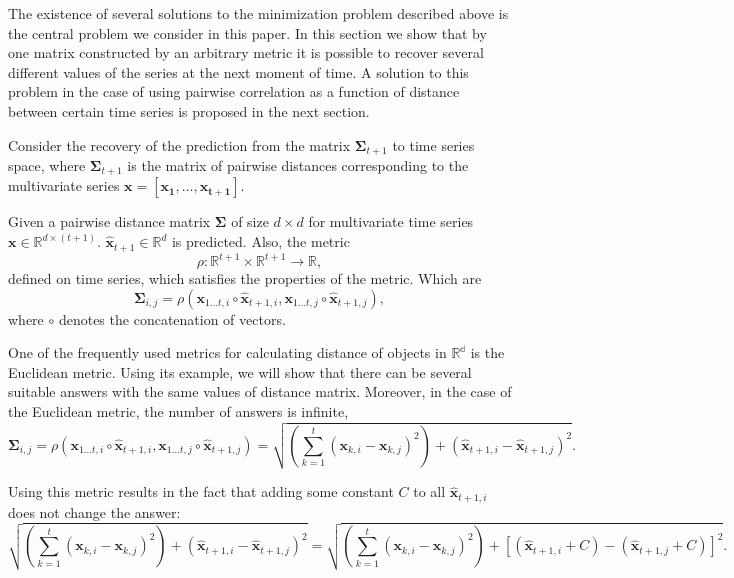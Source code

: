 \documentclass{article}
\begin{document}
The existence of several solutions to the minimization problem described above is the central problem we consider in this paper. In this section we show that by one matrix constructed by an arbitrary metric it is possible to recover several different values of the series at the next moment of time. A solution to this problem in the case of using pairwise correlation as a function of distance between certain time series is proposed in the next section.

Consider the recovery of the prediction from the matrix $\mathbf{\Sigma}_{t+1}$ to time series space, where $\mathbf{\Sigma}_{t+1}$ is the matrix of pairwise distances corresponding to the multivariate series $\mathbf{x}=[\mathbf{x_1}, \ldots, \mathbf{x_{t+1}}]$.

Given a pairwise distance matrix $\mathbf{\Sigma}$ of size $d \times d$ for multivariate time series $\mathbf{x} \in \mathbb{R}^{d \times (t+1)}$. $\hat{\mathbf{x}}_{t+1} \in \mathbb{R}^d$ is predicted. Also, the metric \[ \rho : \mathbb{R}^{t+1} \times \mathbb{R}^{t+1} \rightarrow \mathbb{R}, \] defined on time series, which satisfies the properties of the metric. Which are \[\mathbf{\Sigma}_{i,j} = \rho(\mathbf{x}_{1 \ldots t, i} \circ \hat{\mathbf{x}}_{t+1, i}, \mathbf{x}_{1 \ldots t, j} \circ \hat{\mathbf{x}}_{t+1, j}),\] where $\circ$ denotes the concatenation of vectors.

One of the frequently used metrics for calculating distance of objects in $\mathbb{R^d}$ is the Euclidean metric. Using its example, we will show that there can be several suitable answers with the same values of distance matrix. Moreover, in the case of the Euclidean metric, the number of answers is infinite,
\[\mathbf{\Sigma}_{i,j} = \rho(\mathbf{x}_{1 \ldots t, i} \circ \hat{\mathbf{x}}_{t+1, i}, \mathbf{x}_{1 \ldots t, j} \circ \hat{\mathbf{x}}_{t+1, j})=\sqrt{\left(\sum_{k=1}^t (\mathbf{x}_{k,i}-\mathbf{x}_{k,j})^2\right) + (\hat{\mathbf{x}}_{t+1, i}-\hat{\mathbf{x}}_{t+1, j})^2}.\]

Using this metric results in the fact that adding some constant $C$ to all $\hat{\mathbf{x}}_{t+1, i}$ does not change the answer:
\[
\sqrt{\left(\sum_{k=1}^t (\mathbf{x}_{k,i}-\mathbf{x}_{k,j})^2\right) + (\hat{\mathbf{x}}_{t+1, i}-\hat{\mathbf{x}}_{t+1, j})^2} = \sqrt{\left(\sum_{k=1}^t (\mathbf{x}_{k,i}-\mathbf{x}_{k,j})^2\right) + [(\hat{\mathbf{x}}_{t+1, i} + C) -(\hat{\mathbf{x}}_{t+1, j} + C)]^2}.
\]
\end{document}
